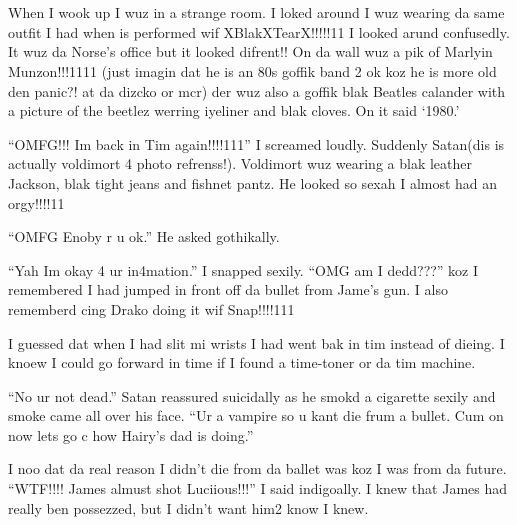 \section{}



When I wook up I wuz in a strange room. I loked around I wuz wearing da same outfit I had when is performed wif XBlakXTearX!!!!!11 I looked arund confusedly. It wuz da Norse's office but it looked difrent!! On da wall wuz a pik of Marlyin Munzon!!!1111 (just imagin dat he is an 80s goffik band 2 ok koz he is more old den panic?! at da dizcko or mcr) der wuz also a goffik blak Beatles calander with a picture of the beetlez werring iyeliner and blak cloves. On it said \enquote*{1980.}

\enquote{OMFG!!! Im back in Tim again!!!!111} I screamed loudly. Suddenly Satan(dis is actually voldimort 4 photo refrenss!). Vol\-di\-mort wuz wearing a blak leather Jackson, blak tight jeans and fishnet pantz. He looked so sexah I almost had an orgy!!!!11

\enquote{OMFG Enoby r u ok.} He asked gothikally.

\enquote{Yah Im okay 4 ur in4mation.} I snapped sexily. \enquote{OMG am I dedd???} koz I remembered I had jumped in front off da bullet from Jame's gun. I also rememberd cing Drako doing it wif Snap!!!!111

I guessed dat when I had slit mi wrists I had went bak in tim instead of dieing. I knoew I could go forward in time if I found a time-toner or da tim machine.

\enquote{No ur not dead.} Satan reassured suicidally as he smokd a cigarette sexily and smoke came all over his face. \enquote{Ur a vampire so u kant die frum a bullet. Cum on now lets go c how Hairy's dad is doing.}

I noo dat da real reason I didn't die from da ballet was koz I was from da future. \enquote{WTF!!!! James almust shot Luciious!!!} I said indigoally. I knew that James had really ben possezzed, but I didn't want him2 know I knew.

